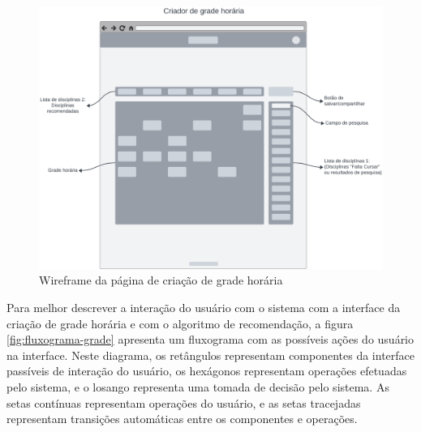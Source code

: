 \begin{figure}[ht]
    \begin{center}
    \includegraphics[width=390pt]{figuras/pagina-criacao.png}
    \caption{Wireframe da página de criação de grade horária}
    \label{fig:wireframe-pagina-criacao}
    \end{center}
\end{figure}

Para melhor descrever a interação do usuário com o sistema com a interface da criação de grade horária e com o algoritmo de recomendação, a figura \ref{fig:fluxograma-grade} apresenta um fluxograma com as possíveis ações do usuário na interface. 
Neste diagrama, os retângulos representam componentes da interface passíveis de interação do usuário, os hexágonos representam operações efetuadas pelo sistema, e o losango representa uma tomada de decisão pelo sistema. 
As setas contínuas representam operações do usuário, e as setas tracejadas representam transições automáticas entre os componentes e operações. 

